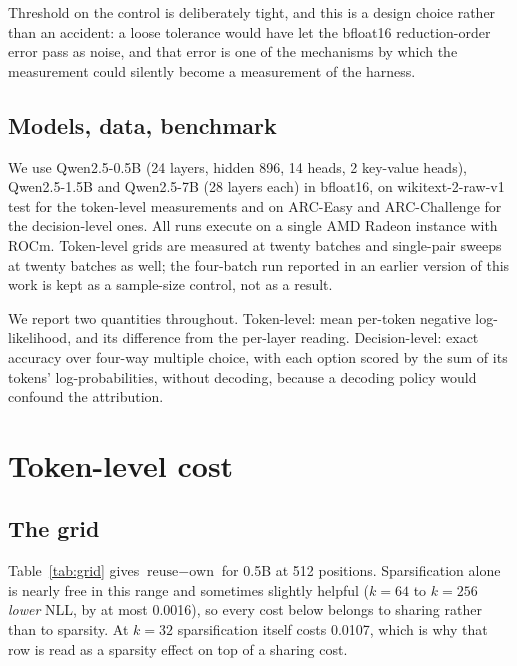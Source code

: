 \documentclass[10pt]{article}
\begin{document}
Threshold on the control is deliberately tight, and this is a design choice
rather than an accident: a loose tolerance would have let the bfloat16
reduction-order error pass as noise, and that error is one of the mechanisms
by which the measurement could silently become a measurement of the harness.

\subsection{Models, data, benchmark}

We use Qwen2.5-0.5B (24 layers, hidden 896, 14 heads, 2 key-value heads),
Qwen2.5-1.5B and Qwen2.5-7B (28 layers each) in bfloat16, on wikitext-2-raw-v1
test for the token-level measurements and on ARC-Easy and ARC-Challenge for the
decision-level ones. All runs execute on a single AMD Radeon instance with ROCm.
Token-level grids are measured at twenty batches and single-pair sweeps at
twenty batches as well; the four-batch run reported in an earlier version of
this work is kept as a sample-size control, not as a result.

We report two quantities throughout. Token-level: mean per-token
negative log-likelihood, and its difference from the per-layer reading. Decision-level:
exact accuracy over four-way multiple choice, with each option scored by the sum
of its tokens' log-probabilities, without decoding, because a decoding
policy would confound the attribution.

\section{Token-level cost}

\subsection{The grid}

Table~\ref{tab:grid} gives $\text{reuse} - \text{own}$ for 0.5B at 512 positions.
Sparsification alone is nearly free in this range and sometimes slightly
helpful ($k=64$ to $k=256$ \emph{lower} NLL, by at most 0.0016), so every cost
below belongs to sharing rather than to sparsity. At $k=32$ sparsification
itself costs 0.0107, which is why that row is read as a sparsity effect on
top of a sharing cost.
\end{document}
